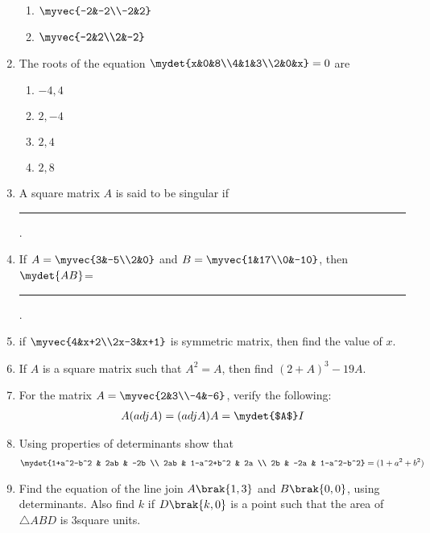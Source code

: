 \begin{enumerate}
\begin{enumerate}
		\item $\myvec{-2&-2\\-2&2}$
		\item $\myvec{-2&2\\2&-2}$
	\end{enumerate}
\item The roots of the equation $\mydet{x&0&8\\4&1&3\\2&0&x}=0$ are
	\begin{enumerate}
		\item $-4,4$
		\item $2,-4$
		\item $2,4$
		\item $2,8$
	\end{enumerate}
\item A square matrix $A$ is said to be singular if \rule{2cm}{0.15mm}.
\item If $A= \myvec{3&-5\\2&0}$ and $B=\myvec{1&17\\0&-10}$, then $\mydet{AB}$= \rule{2cm}{0.15mm}.
\item if $\myvec{4&x+2\\2x-3&x+1}$ is symmetric matrix, then find the value of $x$.
\item If $A$ is a square matrix such that $A^2=A$, then find $(2+A)^3 -19A$.
\item For the matrix $A=\myvec{2&3\\-4&-6}$, verify the following:
	\begin{align}
		A(adj A) = (adj A)A= \mydet{$A$}I
	\end{align}
\item Using properties of determinants show that
	\begin{align}
		\mydet{1+a^2-b^2 & 2ab & -2b \\ 
		2ab & 1-a^2+b^2 & 2a \\ 
		2b & -2a & 1-a^2-b^2} = (1+a^2+b^2)
	\end{align}
\item Find the equation of the line join $A\brak{1, 3}$ and $B\brak{0, 0}$, using determinants. Also find $k$ if $D\brak{k,0}$ is a point such that the area of $\triangle ABD$ is $3$square units.
\end{enumerate}
